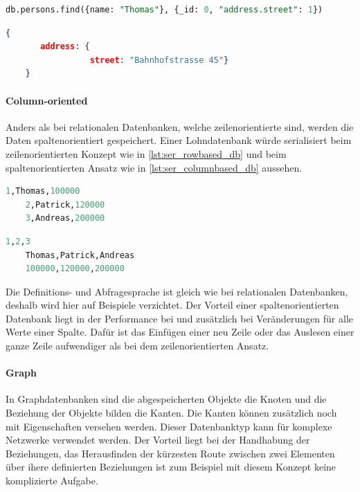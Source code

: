 \begin{lstlisting}[language=SQL, caption=Abfrage in MongoDB, label=lst:select_mongodb]  
    db.persons.find({name: "Thomas"}, {_id: 0, "address.street": 1})
\end{lstlisting}

\begin{lstlisting}[language=JSON, caption=Resultat der Abfrage in MongoDB, label=lst:select_result_mongodb]  
    {
       address: {
                 street: "Bahnhofstrasse 45"}
    }
\end{lstlisting}

\paragraph{Column-oriented}
Anders als bei relationalen Datenbanken, welche zeilenorientierte sind, werden die Daten spaltenorientiert gespeichert. Einer Lohndatenbank würde serialisiert beim zeilenorientierten Konzept
wie in \autoref{lst:ser_rowbased_db} und beim spaltenorientierten Ansatz wie in \autoref{lst:ser_columnbased_db} aussehen.

\begin{lstlisting}[language=SQL, caption=Serialisierung zeilenorientierte Datenbank, label=lst:ser_rowbased_db]  
    1,Thomas,100000
    2,Patrick,120000
    3,Andreas,200000
\end{lstlisting}

\begin{lstlisting}[language=SQL, caption=Serialisierung zeilenorientierte Datenbank, label=lst:ser_columnbased_db]  
    1,2,3
    Thomas,Patrick,Andreas
    100000,120000,200000
\end{lstlisting}

Die Definitions- und Abfragesprache ist gleich wie bei relationalen Datenbanken, deshalb wird hier auf Beispiele verzichtet. Der Vorteil einer spaltenorientierten Datenbank liegt in der Performance bei  und zusätzlich bei Veränderungen für alle Werte einer Spalte. Dafür ist das 
Einfügen einer neu Zeile oder das Auslesen einer ganze Zeile aufwendiger als bei dem zeilenorientierten Ansatz.

\paragraph{Graph}
In Graphdatenbanken sind die abgespeicherten Objekte die Knoten und die Beziehung der Objekte bilden die Kanten. Die Kanten können zusätzlich noch mit Eigenschaften versehen werden. Dieser 
Datenbanktyp kann für komplexe Netzwerke verwendet werden. Der Vorteil liegt bei der Handhabung der Beziehungen, das Herausfinden der kürzesten Route zwischen zwei Elementen über ihere 
definierten Beziehungen ist zum Beispiel mit diesem Konzept keine komplizierte Aufgabe.

